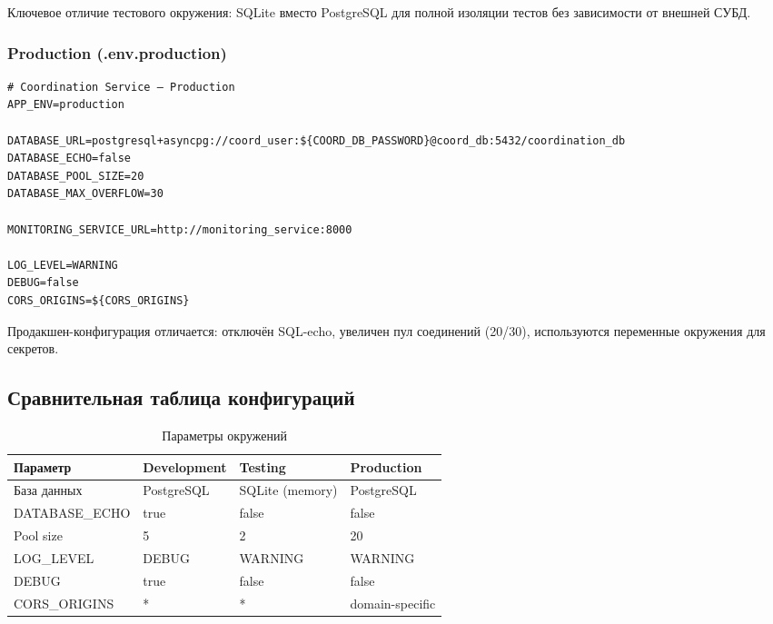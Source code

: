 \documentclass[12pt,a4paper]{article}
\begin{document}
Ключевое отличие тестового окружения: SQLite вместо PostgreSQL для полной
изоляции тестов без зависимости от внешней СУБД.

\subsubsection{Production (.env.production)}

\begin{lstlisting}[style=bash, caption={coordination\_service/.env.production}]
# Coordination Service — Production
APP_ENV=production

DATABASE_URL=postgresql+asyncpg://coord_user:${COORD_DB_PASSWORD}@coord_db:5432/coordination_db
DATABASE_ECHO=false
DATABASE_POOL_SIZE=20
DATABASE_MAX_OVERFLOW=30

MONITORING_SERVICE_URL=http://monitoring_service:8000

LOG_LEVEL=WARNING
DEBUG=false
CORS_ORIGINS=${CORS_ORIGINS}
\end{lstlisting}

Продакшен-конфигурация отличается: отключён SQL-echo, увеличен пул соединений
(20/30), используются переменные окружения для секретов.

\subsection{Сравнительная таблица конфигураций}

\begin{table}[H]
\centering
\caption{Параметры окружений}
\begin{tabularx}{\textwidth}{|l|X|X|X|}
\hline
\textbf{Параметр} & \textbf{Development} & \textbf{Testing} & \textbf{Production} \\
\hline
База данных      & PostgreSQL           & SQLite (memory)  & PostgreSQL \\
\hline
DATABASE\_ECHO   & true                 & false            & false \\
\hline
Pool size        & 5                    & 2                & 20 \\
\hline
LOG\_LEVEL       & DEBUG                & WARNING          & WARNING \\
\hline
DEBUG            & true                 & false            & false \\
\hline
CORS\_ORIGINS    & *                    & *                & domain-specific \\
\hline
\end{tabularx}
\end{table}
\end{document}

